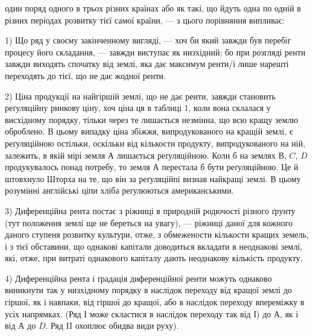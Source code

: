 \parcont{}  %
один поряд одного в трьох різних країнах або як такі, що йдуть одна по одній в різних періодах
розвитку тієї самої країни, — з цього порівняння випливає:

1) Що ряд у своєму закінченному вигляді, — хоч би який завжди був перебіг процесу його складання, —
завжди виступає як низхідний; бо при розгляді ренти завжди виходять спочатку від землі, яка дає
максимум ренти/і лише нарешті переходять до тієї, що не дає жодної ренти.

2) Ціна продукції на найгіршій землі, що не дає ренти, завжди становить реґуляційну ринкову ціну,
хоч ціна ця в таблиці 1, коли вона склалася у висхідному порядку, тільки через те лишається
незмінна, що всю кращу землю оброблено. В цьому випадку ціна збіжжя, випродукованого на кращій
землі, є реґуляційною остільки, оскільки від кількости продукту, випродукованого на ній, залежить, в
якій мірі земля $А$ лишається реґуляційною. Коли б на землях $В$, $C$, $D$ продукувалось понад потребу, то
земля $А$ перестала б бути реґуляційною. Це й штовхнуло Шторха на те, що він за реґуляційпі визнав
найкращі землі. В цьому розумінні англійські ціпи хліба реґулюються американськими.

3) Диференційна рента постає з ріжниці в природній родючості різного ґрунту (тут положення землі ще
не береться на увагу), — ріжниці даної для кожного даного ступеня розвитку культури, отже, з
обмежености кількости кращих земель, і з тієї обставини, що однакові капітали доводиться вкладати в
неоднакові землі, які, отже, при витраті однакового капіталу дають неоднакову кількість продукту.

4) Диференційна рента і ґрадація диференційної ренти можуть однаково виникнути так у низхідному
порядку в наслідок переходу від кращої землі до гіршої, як і навпаки, від гіршої до кращої, або в
наслідок переходу впереміжку в усіх напрямках. (Ряд І може скластися в наслідок переходу так від І)
до $А$, як і від $А$ до $D$. Ряд II охоплює обидва види руху).

